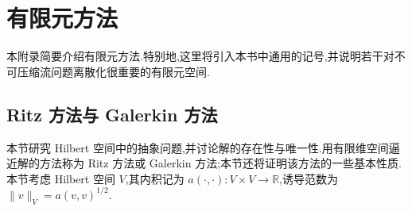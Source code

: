 \chapter{有限元方法}
\label{chap:appendix-b}

\begin{note}[内容提要]\label{note:appendix-b-1}
本附录简要介绍有限元方法.特别地,这里将引入本书中通用的记号,并说明若干对不可压缩流问题离散化很重要的有限元空间.
\end{note}

\section{Ritz 方法与 Galerkin 方法}\label{sec:appendix-b-1}

\begin{note}[内容提要]\label{note:appendix-b-2}
本节研究 Hilbert 空间中的抽象问题,并讨论解的存在性与唯一性.用有限维空间逼近解的方法称为 Ritz 方法或 Galerkin 方法;本节还将证明该方法的一些基本性质.本节考虑 Hilbert 空间 $V$,其内积记为
$a(\cdot,\cdot):V\times V\to\mathbb R$,诱导范数为
$\|v\|_V=a(v,v)^{1/2}$.
\end{note}

